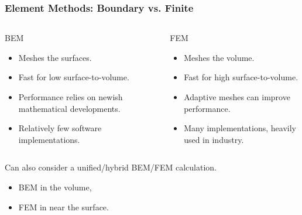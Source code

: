 \documentclass[xcolor=dvipsnames]{beamer}
\begin{document}
\begin{frame}
  \frametitle{Element Methods: Boundary vs. Finite}
  \begin{columns}
    \begin{column}{0.5\textwidth}
      BEM
      \begin{itemize}\footnotesize
      \item Meshes the surfaces.
      \item Fast for low surface-to-volume.
      \item Performance relies on newish mathematical developments.
      \item Relatively few software implementations.
      \end{itemize}      
    \end{column}
    \begin{column}{0.5\textwidth}
      FEM
      \begin{itemize}\footnotesize
      \item Meshes the volume.
      \item Fast for high surface-to-volume.
      \item Adaptive meshes can improve performance.
      \item Many implementations, heavily used in industry.
      \end{itemize}      
    \end{column}
  \end{columns}

  \vspace{10mm}

  Can also consider a unified/hybrid BEM/FEM calculation.  
  \begin{itemize}
  \item BEM in the volume,
  \item   FEM in near the surface.
  \end{itemize}
\end{frame}
\end{document}
